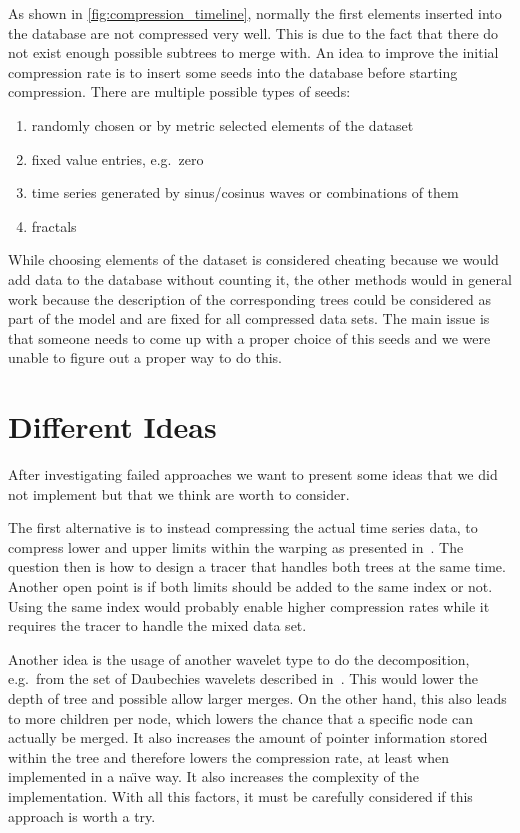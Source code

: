 As shown in \autoref{fig:compression_timeline}, normally the first elements inserted into the database are not compressed very well. This is due to the fact that there do not exist enough possible subtrees to merge with. An idea to improve the initial compression rate is to insert some seeds into the database before starting compression. There are multiple possible types of seeds:

\begin{enumerate}
    \item randomly chosen or by metric selected elements of the dataset
    \item fixed value entries, e.g.\ zero
    \item time series generated by sinus/cosinus waves or combinations of them
    \item fractals
\end{enumerate}

While choosing elements of the dataset is considered cheating because we would add data to the database without counting it, the other methods would in general work because the description of the corresponding trees could be considered as part of the model and are fixed for all compressed data sets. The main issue is that someone needs to come up with a proper choice of this seeds and we were unable to figure out a proper way to do this.



\section{Different Ideas}
\label{sec:algorithm:alternatives}

After investigating failed approaches we want to present some ideas that we did not implement but that we think are worth to consider.

The first alternative is to instead compressing the actual time series data, to compress lower and upper limits within the warping as presented in~\cite{LB_Keogh}. The question then is how to design a tracer that handles both trees at the same time. Another open point is if both limits should be added to the same index or not. Using the same index would probably enable higher compression rates while it requires the tracer to handle the mixed data set.

Another idea is the usage of another wavelet type to do the decomposition, e.g.\ from the set of Daubechies wavelets described in~\cite{daubechies}. This would lower the depth of tree and possible allow larger merges. On the other hand, this also leads to more children per node, which lowers the chance that a specific node can actually be merged. It also increases the amount of pointer information stored within the tree and therefore lowers the compression rate, at least when implemented in a na{\"\i}ve way. It also increases the complexity of the implementation. With all this factors, it must be carefully considered if this approach is worth a try.

